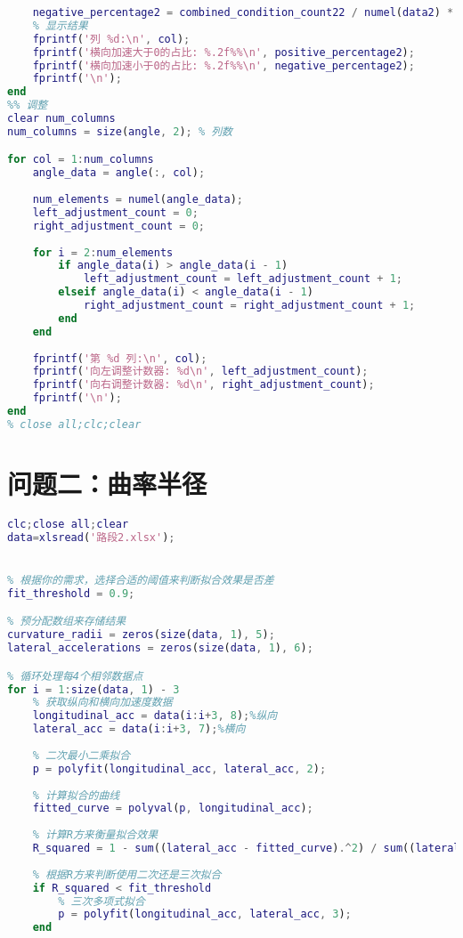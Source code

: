 \documentclass[withoutpreface,bwprint]{cumcmthesis} %
\begin{document}
\begin{appendices}
\begin{lstlisting}[language=matlab]
    % 计算小于0的元素占比
    negative_percentage2 = combined_condition_count22 / numel(data2) * 100;
    % 显示结果
    fprintf('列 %d:\n', col);
    fprintf('横向加速大于0的占比: %.2f%%\n', positive_percentage2);
    fprintf('横向加速小于0的占比: %.2f%%\n', negative_percentage2);
    fprintf('\n');
end
%% 调整
clear num_columns
num_columns = size(angle, 2); % 列数

for col = 1:num_columns
    angle_data = angle(:, col);
    
    num_elements = numel(angle_data);
    left_adjustment_count = 0;
    right_adjustment_count = 0;
    
    for i = 2:num_elements
        if angle_data(i) > angle_data(i - 1)
            left_adjustment_count = left_adjustment_count + 1;
        elseif angle_data(i) < angle_data(i - 1)
            right_adjustment_count = right_adjustment_count + 1;
        end
    end
    
    fprintf('第 %d 列:\n', col);
    fprintf('向左调整计数器: %d\n', left_adjustment_count);
    fprintf('向右调整计数器: %d\n', right_adjustment_count);
    fprintf('\n');
end
% close all;clc;clear
 \end{lstlisting}

 
 \section{问题二：曲率半径}
\begin{lstlisting}[language=matlab]
clc;close all;clear
data=xlsread('路段2.xlsx');


% 根据你的需求，选择合适的阈值来判断拟合效果是否差
fit_threshold = 0.9; 

% 预分配数组来存储结果
curvature_radii = zeros(size(data, 1), 5);
lateral_accelerations = zeros(size(data, 1), 6);

% 循环处理每4个相邻数据点
for i = 1:size(data, 1) - 3
    % 获取纵向和横向加速度数据
    longitudinal_acc = data(i:i+3, 8);%纵向
    lateral_acc = data(i:i+3, 7);%横向
    
    % 二次最小二乘拟合
    p = polyfit(longitudinal_acc, lateral_acc, 2);
    
    % 计算拟合的曲线
    fitted_curve = polyval(p, longitudinal_acc);
    
    % 计算R方来衡量拟合效果
    R_squared = 1 - sum((lateral_acc - fitted_curve).^2) / sum((lateral_acc - mean(lateral_acc)).^2);
    
    % 根据R方来判断使用二次还是三次拟合
    if R_squared < fit_threshold
        % 三次多项式拟合
        p = polyfit(longitudinal_acc, lateral_acc, 3);
    end
    

\end{lstlisting}
\end{appendices}
\end{document}
